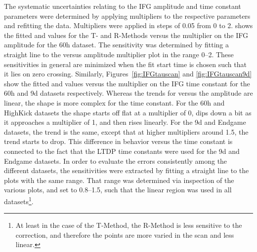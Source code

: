 The systematic uncertainties relating to the IFG amplitude and time constant parameters were determined by applying multipliers to the respective parameters and refitting the data. Multipliers were applied in steps of 0.05 from 0 to 2.  shows the fitted \R and \chisq values for the T- and R-Methods versus the multiplier on the IFG amplitude for the 60h dataset. The sensitivity was determined by fitting a straight line to the \R versus amplitude multiplier plot in the range 0--2. These sensitivities in general are minimized when the fit start time is chosen such that it lies on \gmtwo zero crossing. Similarly, Figures~\ref{fig:IFGtauscan} and \ref{fig:IFGtauscan9d} show the fitted \R and \chisq values versus the multiplier on the IFG time constant for the 60h and 9d datasets respectively. Whereas the trends for \R versus the amplitude are linear, the shape is more complex for the time constant. For the 60h and HighKick datasets the shape starts off flat at a multiplier of 0, dips down a bit as it approaches a multiplier of 1, and then rises linearly. For the 9d and Endgame datasets, the trend is the same, except that at higher multipliers around 1.5, the trend starts to drop. This difference in behavior versus the time constant is connected to the fact that the LTDP time constants were used for the 9d and Endgame datasets. In order to evaluate the errors consistently among the different datasets, the sensitivities were extracted by fitting a straight line to the plots with the same range. That range was determined via inspection of the various plots, and set to 0.8--1.5, such that the linear region was used in all datasets\footnote{At least in the case of the T-Method, the R-Method is less sensitive to the correction, and therefore the points are more varied in the scan and less linear.}. 



